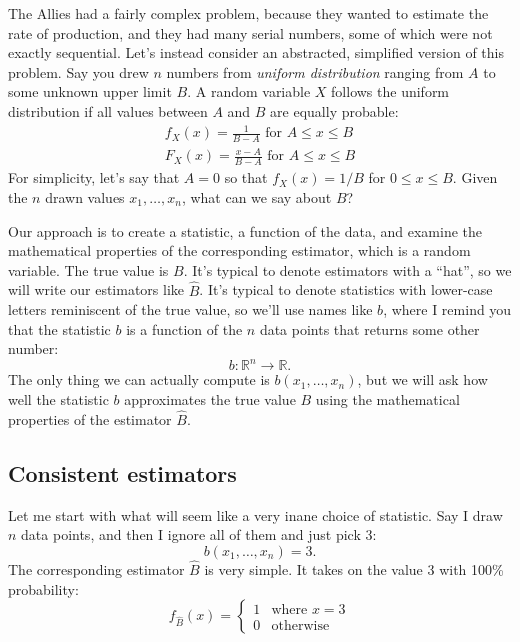 The Allies had a fairly complex problem, because they wanted to estimate the
rate of production, and they had many serial numbers, some of which were not
exactly sequential. Let's instead consider an abstracted, simplified version of
this problem. Say you drew $n$ numbers from \emph{uniform distribution} ranging
from $A$ to some unknown upper limit $B$. A random variable $X$ follows the
uniform distribution if all values between $A$ and $B$ are equally probable:
\begin{gather*}
    f_X(x) = \frac{1}{B-A} \text{ for } A \leq x \leq B \\
    F_X(x) = \frac{x-A}{B-A} \text{ for } A \leq x \leq B
\end{gather*}
For simplicity, let's say that $A=0$ so that $f_X(x) = 1/B$ for $0 \leq x \leq B$.
Given the $n$ drawn values $x_1, \ldots, x_n$, what can we say about $B$?

Our approach is to create a statistic, a function of the data, and examine the
mathematical properties of the corresponding estimator, which is a random
variable. The true value is $B$. It's typical to denote estimators with a
``hat'', so we will write our estimators like $\hat{B}$. It's typical to denote
statistics with lower-case letters reminiscent of the true value, so we'll
use names like $b$, where I remind you that the statistic $b$ is a function of
the $n$ data points that returns some other number:
\begin{equation*}
b : \mathbb{R}^n \to \mathbb{R}.
\end{equation*}
The only thing we can actually compute is $b(x_1, \ldots, x_n)$, but we will
ask how well the statistic $b$ approximates the true value $B$ using the
mathematical properties of the estimator $\hat{B}$.

\subsection{Consistent estimators}

Let me start with what will seem like a very inane choice of statistic.
Say I draw $n$ data points, and then I ignore all of them and just
pick 3:
\begin{equation}
    b(x_1, \ldots, x_n) = 3.
\end{equation}
The corresponding estimator $\hat{B}$ is very simple. It takes on the
value 3 with 100\% probability:
\begin{equation*}
    f_{\hat{B}}(x) = \begin{cases}
        1 &\text{where } x = 3 \\
        0 &\text{otherwise}
    \end{cases}
\end{equation*}

